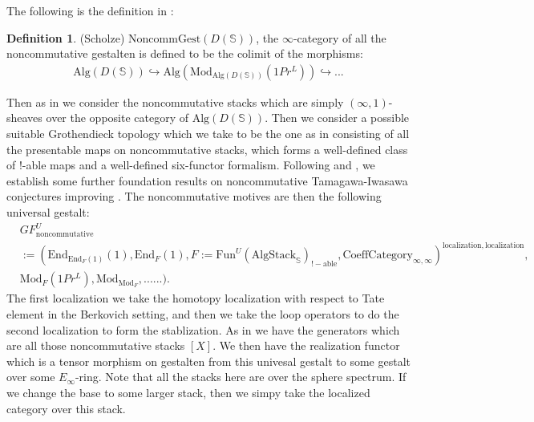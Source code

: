 \documentclass[12pt]{article}
\theoremstyle{definition}
\newtheorem{definition}{Definition}
\begin{document}
\noindent The following is the definition in \cite{5S5}:
\begin{definition}\mbox{(Scholze)}
$\mathrm{NoncommGest}(D(\mathbb{S}))$, the $\infty$-category of all the noncommutative gestalten is defined to be the colimit of the morphisms:
\begin{align}
\mathrm{Alg}(D(\mathbb{S}))\hookrightarrow \mathrm{Alg}(\mathrm{Mod}_{\mathrm{Alg}(D(\mathbb{S}))}(1Pr^L))\hookrightarrow ...
\end{align}
\end{definition}
Then as in \cite{5S5} we consider the noncommutative stacks which are simply $(\infty,1)$-sheaves over the opposite category of $\mathrm{Alg}(D(\mathbb{S}))$. Then we consider a possible suitable Grothendieck topology which we take to be the one as in \cite{5S5} consisting of all the presentable maps on noncommutative stacks, which forms a well-defined class of $!$-able maps and a well-defined six-functor formalism. Following \cite{5S5} and \cite{5Ga}, we establish some further foundation results on noncommutative Tamagawa-Iwasawa conjectures improving \cite{T}. The noncommutative motives are then the following universal gestalt:
\begin{align}
&GF_\mathrm{noncommutative}^U\\
&:=(\mathrm{End}_{\mathrm{End}_F(1)}(1),\mathrm{End}_F(1),F:=\mathrm{Fun}^U(\mathrm{AlgStack}_\mathbb{S})_{!-\mathrm{able}}, \mathrm{CoeffCategory}_{\infty,\infty})^{\mathrm{localization,localization}},\\
&\mathrm{Mod}_F(1Pr^L),\mathrm{Mod}_{\mathrm{Mod}_F},......).
\end{align}
The first localization we take the homotopy localization with respect to Tate element in the Berkovich setting, and then we take the loop operators to do the second localization to form the stablization. As in \cite{5S4} we have the generators which are all those noncommutative stacks $[X]$. We then have the realization functor which is a tensor morphism on gestalten from this univesal gestalt to some gestalt over some $E_\infty$-ring. Note that all the stacks here are over the sphere spectrum. If we change the base to some larger stack, then we simpy take the localized category over this stack.
\end{document}
